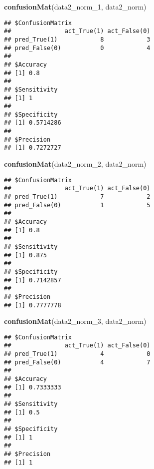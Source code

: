\documentclass[]{article}
\newenvironment{Shaded}{\begin{snugshade}}{\end{snugshade}}
\newcommand{\KeywordTok}[1]{\textcolor[rgb]{0.13,0.29,0.53}{\textbf{#1}}}
\newcommand{\DecValTok}[1]{\textcolor[rgb]{0.00,0.00,0.81}{#1}}
\newcommand{\NormalTok}[1]{#1}
\begin{document}
\begin{Shaded}
\begin{Highlighting}[]
\KeywordTok{confusionMat}\NormalTok{(data2_norm_}\DecValTok{1}\NormalTok{, data2_norm)}
\end{Highlighting}
\end{Shaded}

\begin{verbatim}
## $ConfusionMatrix
##               act_True(1) act_False(0)
## pred_True(1)            8            3
## pred_False(0)           0            4
## 
## $Accuracy
## [1] 0.8
## 
## $Sensitivity
## [1] 1
## 
## $Specificity
## [1] 0.5714286
## 
## $Precision
## [1] 0.7272727
\end{verbatim}

\begin{Shaded}
\begin{Highlighting}[]
\KeywordTok{confusionMat}\NormalTok{(data2_norm_}\DecValTok{2}\NormalTok{, data2_norm)}
\end{Highlighting}
\end{Shaded}

\begin{verbatim}
## $ConfusionMatrix
##               act_True(1) act_False(0)
## pred_True(1)            7            2
## pred_False(0)           1            5
## 
## $Accuracy
## [1] 0.8
## 
## $Sensitivity
## [1] 0.875
## 
## $Specificity
## [1] 0.7142857
## 
## $Precision
## [1] 0.7777778
\end{verbatim}

\begin{Shaded}
\begin{Highlighting}[]
\KeywordTok{confusionMat}\NormalTok{(data2_norm_}\DecValTok{3}\NormalTok{, data2_norm)}
\end{Highlighting}
\end{Shaded}

\begin{verbatim}
## $ConfusionMatrix
##               act_True(1) act_False(0)
## pred_True(1)            4            0
## pred_False(0)           4            7
## 
## $Accuracy
## [1] 0.7333333
## 
## $Sensitivity
## [1] 0.5
## 
## $Specificity
## [1] 1
## 
## $Precision
## [1] 1
\end{verbatim}
\end{document}
